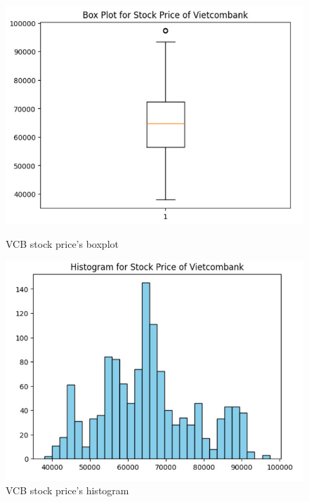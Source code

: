\begin{figure}[H]
    \centering
    \begin{minipage}{0.23\textwidth}
    \centering
    \includegraphics[width=1\textwidth]{resources/chapter-3/Boxplot_Vietcombank.jpg}
    \caption{VCB stock price's boxplot}
    \label{fig:vcb_boxplot}
    \end{minipage}
    \hfill
    \begin{minipage}{0.23\textwidth}
    \centering
    \includegraphics[width=1\textwidth]{resources/chapter-3/Histogram_Vietcombank.jpg}
    \caption{VCB stock price's histogram}
    \label{fig:vcb_histogram}
    \end{minipage}
\end{figure}

